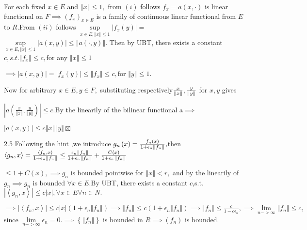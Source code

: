 \documentclass{article}
\begin{document}
 For each fixed $x\in E$ and $\left\Vert x\right\Vert \leq 1,$%
from $\left( i\right) $ follows $f_{x}=a\left( x,\cdot \right) $ is linear
functional on $F\implies \left( f_{x}\right) _{x\in E}$ is a family of
continuous linear functional from $E$ to $R.$From $\left( ii\right) $
follows $\underset{x\in E,\left\Vert x\right\Vert \leq 1}{\sup }\left\vert
f_{x}\left( y\right) \right\vert =$ $\underset{x\in E,\left\Vert
x\right\Vert \leq 1}{\sup }\left\vert a\left( x,y\right) \right\vert \leq
\left\Vert a\left( \cdot ,y\right) \right\Vert .$ Then by UBT, there exists
a constant $c,s.t.\left\Vert f_{x}\right\Vert \leq c,$for any $\left\Vert
x\right\Vert \leq 1$

$\implies \left\vert a\left( x,y\right) \right\vert =\left\vert f_{x}\left(
y\right) \right\vert \leq \left\Vert f_{x}\right\Vert \leq c,$for $%
\left\Vert y\right\Vert \leq 1.$

Now for arbitrary $x\in E,y\in F,$ substituting respectively$\frac{x}{%
\left\Vert x\right\Vert },\frac{y}{\left\Vert y\right\Vert }$ for $x,y$ gives

$\left\vert a\left( \frac{x}{\left\Vert x\right\Vert },\frac{y}{\left\Vert
y\right\Vert }\right) \right\vert \leq c.$By the linearily of the bilinear
functional a$\implies $

$\left\vert a\left( x,y\right) \right\vert \leq c\left\Vert x\right\Vert
\left\Vert y\right\Vert \boxtimes $

2.5 Following the hint ,we introduce $g_{n}\left( x\right) =\frac{%
f_{n}\left( x\right) }{1+\epsilon _{n}\left\Vert f_{n}\right\Vert },$then $%
\left\langle g_{n},x\right\rangle =\frac{\left\langle f_{n},x\right\rangle }{%
1+\epsilon _{n}\left\Vert f_{n}\right\Vert }\leq \frac{\epsilon
_{n}\left\Vert f_{n}\right\Vert }{1+\epsilon _{n}\left\Vert f_{n}\right\Vert 
}+\frac{C\left( x\right) }{1+\epsilon _{n}\left\Vert f_{n}\right\Vert }$

$\leq 1+C\left( x\right) ,\implies g_{n}$ is bounded pointwise for $%
\left\Vert x\right\Vert <r,$ and by the linearily of $g_{n}\implies g_{n}$
is bounded $\forall x\in E.$By UBT, there exists a constant $c$,s.t.$%
\left\vert \left\langle g_{n},x\right\rangle \right\vert \leq c\left\vert
x\right\vert ,\forall x\in E\forall n\in N.$

$\implies \left\vert \left\langle f_{n},x\right\rangle \right\vert \leq
c\left\vert x\right\vert \left( 1+\epsilon _{n}\left\Vert f_{n}\right\Vert
\right) \implies \left\Vert f_{n}\right\Vert \leq c\left( 1+\epsilon
_{n}\left\Vert f_{n}\right\Vert \right) \implies \left\Vert f_{n}\right\Vert
\leq \frac{c}{1-c\epsilon _{n}},\implies \underset{n->\infty }{\lim }%
\left\Vert f_{n}\right\Vert \leq c,$since $\underset{n->\infty }{\lim }%
\epsilon _{n}=0.\implies \left\{ \left\Vert f_{n}\right\Vert \right\} $ is
bounded in $R\implies \left( f_{n}\right) $ is bounded.
\end{document}
